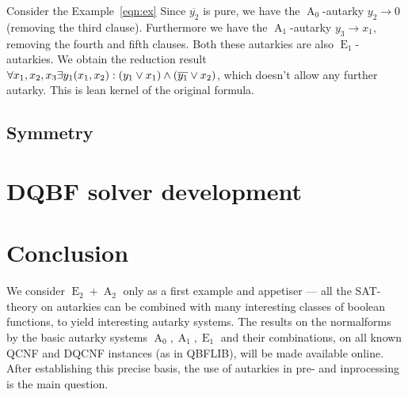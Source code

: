 \documentclass[conference]{IEEEtran}
\DeclareMathOperator{\Aaut}{A}
\DeclareMathOperator{\Eaut}{E}
\begin{document}
Consider the Example~\ref{eqn:ex}
Since $\overline{y_2}$ is pure, we have the $\Aaut_0$-autarky $y_2 \rightarrow 0$ (removing the third clause).
Furthermore we have the $\Aaut_1$-autarky $y_3 \rightarrow x_1$, removing the fourth and fifth clauses.
Both these autarkies are also $\Eaut_1$-autarkies.
We obtain the reduction result $\forall x_1,x_2,x_3 \exists y_1(x_1,x_2) : (y_1 \vee x_1) \wedge (\overline{y_1} \vee x_2)$, 
which doesn't allow any further autarky. 
%
This is lean kernel of the original formula.
\subsection{Symmetry}
\label{sec:sym}

\section{DQBF solver development}
\label{sec:dev}

\section{Conclusion}
\label{sec:conc}

We consider $\Eaut_2 + \Aaut_2$ only as a first example and appetiser --- all the SAT-theory on autarkies can be combined with many interesting classes of boolean functions, to yield interesting autarky systems.
The results on the normalforms by the basic autarky systems $\Aaut_0, \Aaut_1, \Eaut_1$ and their combinations, on all known QCNF and DQCNF instances (as in QBFLIB), will be made available online.
After establishing this precise basis, the use of autarkies in pre- and inprocessing is the main question.





\end{document}
